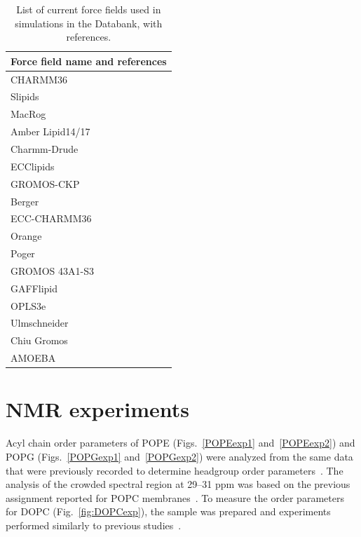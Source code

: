 \documentclass[fleqn,10pt]{wlscirepSI}
\begin{document}
\begin{table}[p]
    \centering
    \begin{tabular}{l}
    Force field name and references \\
    \hline
    CHARMM36~\cite{klauda10}\\
    Slipids~\cite{jambeck12,jambeck12b,jambeck2012another,ermilova16,grote20}  \\
    MacRog~\cite{Kulig15b}  \\
    Amber Lipid14/17~\cite{dickson14,dickson22}  \\
    Charmm-Drude~\cite{li2017drude}      \\
    ECClipids~\cite{melcr18,melcr20,bacle21}  \\
    GROMOS-CKP~\cite{Chandrasekhar03,kukol09,piggot12}  \\
    Berger~\cite{berger97}  \\
    ECC-CHARMM36~\cite{nencini2019development}  \\
    Orange~\cite{catte16}  \\
    Poger~\cite{poger10}  \\
    GROMOS 43A1-S3~\cite{chiu09}  \\ 
    GAFFlipid~\cite{dickson12}  \\
    OPLS3e~\cite{roos19}  \\
    Ulmschneider~\cite{Ulmschneider09}  \\
    Chiu Gromos~\cite{chiu09}  \\
    AMOEBA~\cite{chu2018polarizable} \\
    \end{tabular}
    \caption{List of current force fields used in simulations in the Databank, with references.}
    \label{tab:ForceFields}
\end{table}



\clearpage
\section{NMR experiments}
Acyl chain order parameters of POPE (Figs.~\ref{POPEexp1} and~\ref{POPEexp2}) and POPG (Figs.~\ref{POPGexp1} and~\ref{POPGexp2}) were analyzed from the same data that were previously recorded to determine headgroup order parameters~\cite{bacle21}. The analysis of the crowded spectral region at 29--31 ppm was based on the previous assignment reported for POPC membranes~\cite{ferreira13}. To measure the order parameters for DOPC (Fig.~\ref{fig:DOPCexp}), the sample was prepared and experiments performed similarly to previous studies~\cite{bacle21}.
\end{document}
